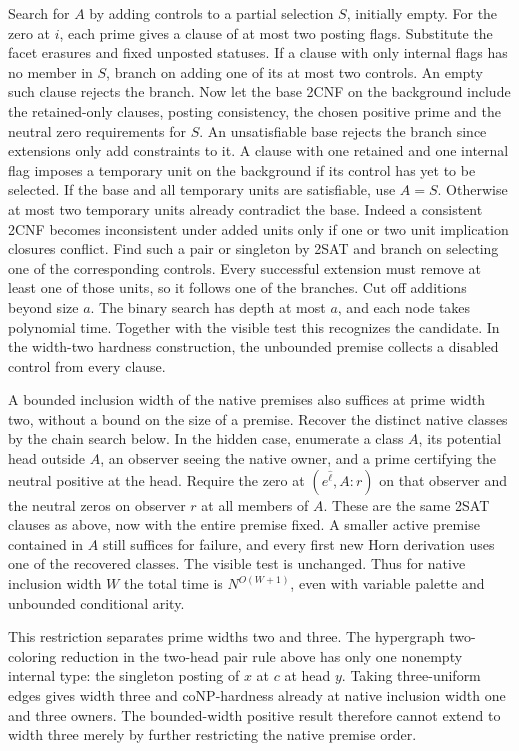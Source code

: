 Search for $A$ by adding controls to a partial selection
$S$, initially empty. For the zero at $i$, each prime
gives a clause of at most two posting flags. Substitute
the facet erasures and fixed unposted statuses. If a
clause with only internal flags has no member in $S$,
branch on adding one of its at most two controls.
An empty such clause rejects the branch.
Now let the base 2CNF on the background include the
retained-only clauses, posting consistency, the chosen
positive prime and the neutral zero requirements for
$S$. An unsatisfiable base rejects the branch since
extensions only add constraints to it. A clause with
one retained and one internal flag imposes a temporary
unit on the background if its control has yet to be
selected. If the base and all temporary units are
satisfiable, use $A=S$. Otherwise at most two temporary
units already contradict the base. Indeed a consistent
2CNF becomes inconsistent under added units only if one
or two unit implication closures conflict. Find such
a pair or singleton by 2SAT and branch on selecting one
of the corresponding controls. Every successful extension
must remove at least one of those units, so it follows
one of the branches. Cut off additions beyond size $a$.
The binary search has depth at most $a$, and each node
takes polynomial time. Together with the visible test
this recognizes the candidate. In the width-two hardness
construction, the unbounded premise collects a disabled
control from every clause.

A bounded inclusion width of the native
premises also suffices at prime width two,
without a bound on the size of a premise.
Recover the distinct native classes by the
chain search below. In the hidden case,
enumerate a class $A$, its potential head
outside $A$, an observer seeing the native
owner, and a prime certifying the neutral
positive at the head. Require the zero at
$(e^{\widehat\ell},A:r)$ on that observer
and the neutral zeros on observer $r$ at
all members of $A$. These are the same
2SAT clauses as above, now with the entire
premise fixed. A smaller active premise
contained in $A$ still suffices for failure,
and every first new Horn derivation uses
one of the recovered classes. The visible
test is unchanged. Thus for native
inclusion width $W$ the total time is
$N^{O(W+1)}$, even with variable palette
and unbounded conditional arity.

This restriction separates prime widths
two and three. The hypergraph two-coloring
reduction in the two-head pair rule above
has only one nonempty internal type:
the singleton posting of $x$ at $c$ at
head $y$. Taking three-uniform edges gives
width three and coNP-hardness already at
native inclusion width one and three
owners. The bounded-width positive result
therefore cannot extend to width three
merely by further restricting the native
premise order.

